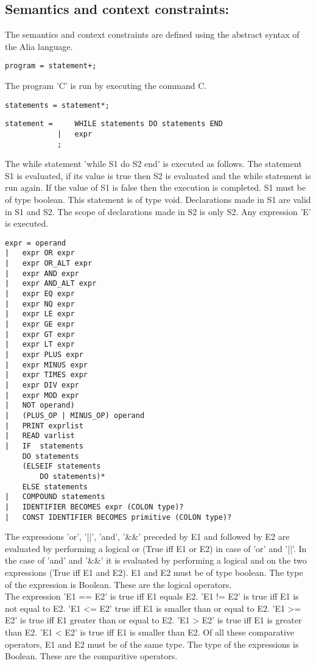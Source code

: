 \documentclass[paper=a4, fontsize=11pt]{article}
\numberwithin{equation}{section}		%
\numberwithin{figure}{section}			%
\numberwithin{table}{section}				%
\begin{document}
\subsection{Semantics and context constraints:}
The semantics and context constraints are defined using the abstract syntax of the Alia language.
\begin{verbatim}
program = statement+;
\end{verbatim}
The program 'C' is run by executing the command C.
\begin{verbatim}
statements = statement*;
\end{verbatim}
\begin{verbatim}
statement = 	WHILE statements DO statements END
			|	expr
			;
\end{verbatim}
The while statement 'while S1 do S2 end' is executed as follows. The statement S1 is evaluated, if its value is true then S2 is evaluated and the while statement is run again. If the value of S1 is false then the execution is completed. S1 must be of type boolean. This statement is of type void. Declarations made in S1 are valid in S1 and S2. The scope of declarations made in S2 is only S2.
Any expression 'E' is executed.

\begin{verbatim}
expr = operand
|   expr OR expr
|   expr OR_ALT expr
|   expr AND expr
|   expr AND_ALT expr
|   expr EQ expr
|   expr NQ expr
|   expr LE expr
|   expr GE expr
|   expr GT expr
|   expr LT expr
|   expr PLUS expr
|   expr MINUS expr
|   expr TIMES expr
|   expr DIV expr
|   expr MOD expr
| 	NOT operand)
|	(PLUS_OP | MINUS_OP) operand
| 	PRINT exprlist
| 	READ varlist
|   IF	statements
   	DO statements
   	(ELSEIF statements
		DO statements)*
	ELSE statements
|   COMPOUND statements
|   IDENTIFIER BECOMES expr (COLON type)?
|   CONST IDENTIFIER BECOMES primitive (COLON type)?
\end{verbatim}
The expressions 'or', '||', 'and', '\&\&' preceded by E1 and followed by E2 are evaluated by performing a logical or (True iff E1 or E2) in case of 'or' and '||'. In the case of 'and' and '\&\&' it is evaluated by performing a logical and on the two expressions (True iff E1 and E2). E1 and E2 must be of type boolean. The type of the expression is Boolean. These are the logical operators. \\

The expression 'E1 == E2' is true iff E1 equals E2. 'E1 != E2' is true iff E1 is not equal to E2. 'E1 <= E2' true iff E1 is smaller than or equal to E2. 'E1 >= E2' is true iff E1 greater than or equal to E2. 'E1 > E2' is true iff E1 is greater than E2. 'E1 < E2' is true iff E1 is smaller than E2.
Of all these comparative operators, E1 and E2 must be of the same type. The type of the expressions is Boolean. These are the comparitive operators. \\
\end{document}
